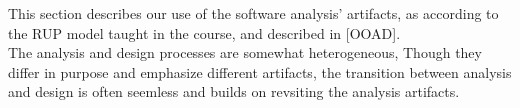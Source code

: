 This section describes our use of the software analysis' artifacts, as according to the RUP model taught in the course, and described in [OOAD]\cite{ooad}.\\
The analysis and design processes are somewhat heterogeneous, Though they differ in purpose and emphasize different artifacts, the transition between analysis and design is often seemless and builds on revsiting the analysis artifacts.
